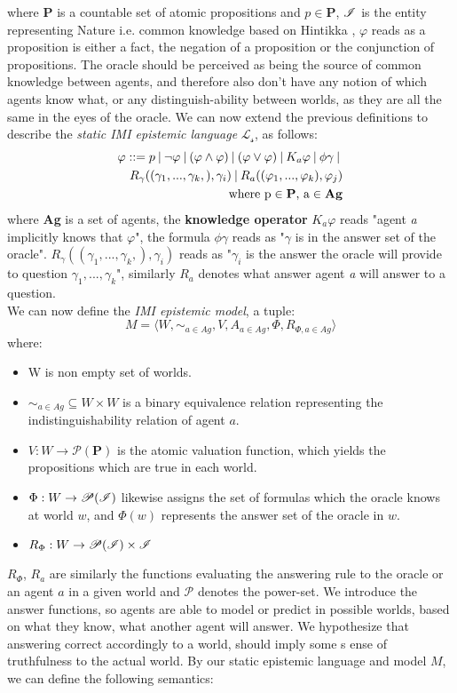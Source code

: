 where \textbf{P} is a countable set of atomic propositions and $p \in
	\mathbf{P}$, $\mathscr{I}$ is the entity representing Nature i.e. common knowledge
based on Hintikka \cite{hintikka88}, $\varphi$ reads as a proposition is either
a fact, the negation of a proposition or the conjunction of propositions. The oracle should be perceived as being the source of common knowledge between agents, and therefore also don't have any notion of which agents know what, or any distinguish-ability between worlds, as they are all the same in the eyes of the oracle.
We can now extend the previous definitions to describe the \textit{static IMI
	epistemic language} $\mathscr{L_s}$, as follows:
\begin{align*}
	\varphi ::= p \:|\:\neg\varphi\:|\:(\varphi \land \varphi) \:|\: (\varphi \lor \varphi) \:|\: K_a\varphi \:|\: \phi\gamma \:|\: \\ R_\gamma((\gamma_1,...,\gamma_k,), \gamma_i) \:|\: R_a((\varphi_1,...,\varphi_k), \varphi_j) \\ \text{where p} \in \text{\textbf{P}}\text{, a} \in \text{\textbf{Ag}}
\end{align*}
where \textbf{Ag} is a set of agents, the \textbf{knowledge operator} $K_a\varphi$ reads "agent \textit{a} implicitly knows that $\varphi$", the formula $\phi\gamma$ reads as "$\gamma$ is in the answer set of the oracle". $R_\gamma((\gamma_1,...,\gamma_k,), \gamma_i)$ reads as "$\gamma_i$ is the answer the oracle will provide to question $\gamma_1,...,\gamma_k$", similarly $R_a$ denotes what answer agent \textit{a} will answer to a question. \\

We can now define the \textit{IMI epistemic model}, a tuple:
$$
	M = \langle W, \sim_{a\in Ag}, V, A_{a\in Ag}, \Phi, R_{\Phi
		,a\in Ag}\rangle
$$
where:
\begin{itemize}
	\setlength\itemsep{-0.4em}
	\item W is non empty set of worlds.
	\item $\sim_{a\in Ag} \subseteq W \times W$ is a binary equivalence relation representing the indistinguishability relation of agent $a$.
	\item $V : W \rightarrow \mathscr{P}(\mathbf{P})$ is the atomic valuation function, which yields the propositions which are true in each world. 
	\item $\Phi : W \rightarrow \mathscr{P}(\mathscr{I}) $ likewise assigns the set of formulas which the oracle knows at world $w$, and $\Phi(w)$ represents the answer set of the oracle in $w$.
	\item $R_{\Phi} : W \rightarrow \mathscr{P}(\mathscr{I}) \times \mathscr{I}$
\end{itemize}
$R_{\Phi}$, $R_{a}$ are similarly the functions evaluating the answering rule to the oracle or an agent $a$ in a given world and $\mathscr{P}$ denotes the power-set. We introduce the answer functions, so agents are able to model or predict in possible worlds, based on what they know, what another agent will answer. We hypothesize that answering correct accordingly to a world, should imply some s
ense of truthfulness to the actual world. By our static epistemic language \staticlang and model $M$, we can define the following semantics:

